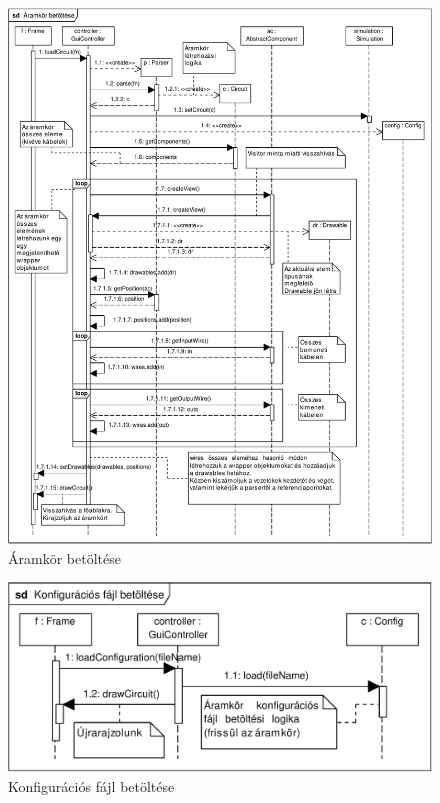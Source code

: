 \begin{figure}[h]
\begin{center}
\includegraphics[width=17cm]{chapters/chapter11/pdfs/2_loadcircuit.pdf}
\caption{Áramkör betöltése}
\label{fig:loadcircuit}
\end{center}
\end{figure}

\begin{figure}[h]
\begin{center}
\includegraphics[width=17cm]{chapters/chapter11/pdfs/3_loadconfig.pdf}
\caption{Konfigurációs fájl betöltése}
\label{fig:loadconfig}
\end{center}
\end{figure}

